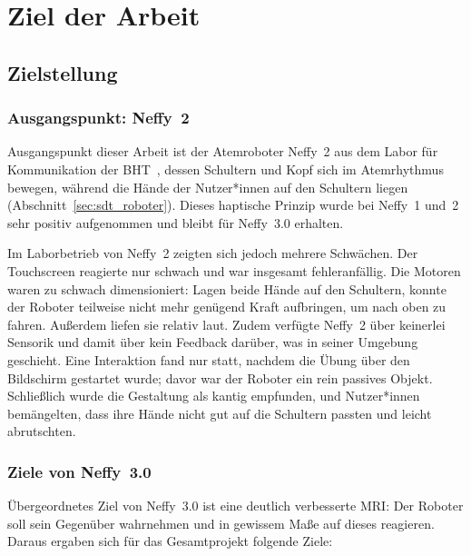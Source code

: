 \chapter{Ziel der Arbeit}
\label{kap:ziel}

\section{Zielstellung}
\label{sec:zielstellung}

\subsection*{Ausgangspunkt: Neffy~2}

Ausgangspunkt dieser Arbeit ist der Atemroboter Neffy~2 aus dem Labor für Kommunikation
der \ac{BHT}~\cite{goerke2025neffy2}, dessen Schultern und Kopf sich im Atemrhythmus bewegen,
während die Hände der Nutzer*innen auf den Schultern liegen (Abschnitt~\ref{sec:sdt_roboter}).
Dieses haptische Prinzip wurde bei Neffy~1 und~2 sehr positiv aufgenommen
\cite{thomas2025neffy,buchem2026neffy2} und bleibt für Neffy~3.0 erhalten.

Im Laborbetrieb von Neffy~2 zeigten sich jedoch mehrere Schwächen. Der Touchscreen
reagierte nur schwach und war insgesamt fehleranfällig. Die Motoren waren zu schwach
dimensioniert: Lagen beide Hände auf den Schultern, konnte der Roboter teilweise nicht
mehr genügend Kraft aufbringen, um nach oben zu fahren. Außerdem liefen sie relativ laut.
Zudem verfügte Neffy~2 über keinerlei Sensorik und damit über kein Feedback darüber,
was in seiner Umgebung geschieht. Eine Interaktion fand nur statt, nachdem die
Übung über den Bildschirm gestartet wurde; davor war der Roboter ein rein passives
Objekt. Schließlich wurde die Gestaltung als kantig empfunden, und Nutzer*innen
bemängelten, dass ihre Hände nicht gut auf die Schultern passten und leicht abrutschten.

\subsection*{Ziele von Neffy~3.0}

Übergeordnetes Ziel von Neffy~3.0 ist eine deutlich verbesserte
\ac{MRI}: Der Roboter soll sein Gegenüber wahrnehmen und in gewissem Maße auf
dieses reagieren. Daraus ergaben sich für das Gesamtprojekt folgende Ziele:

